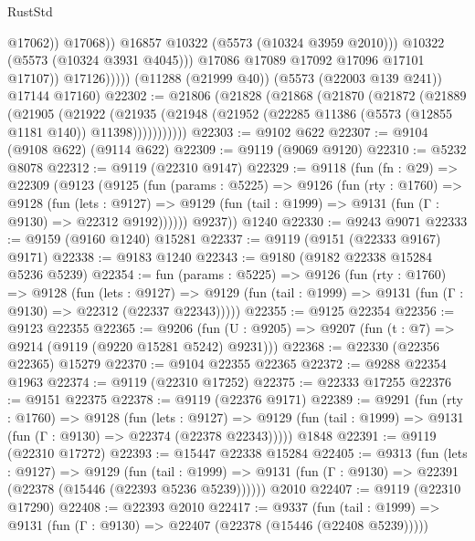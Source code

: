 \begin{lexlean}{RustStd}
\begin{coremodule}
                                @17062))
                            @17068))
                        @16857
                        @10322
                        (@5573 (@10324 @3959 @2010)))
                      @10322
                      (@5573 (@10324 @3931 @4045)))
                    @17086
                    @17089
                    @17092
                    @17096
                    @17101
                    @17107))
                @17126)))))
      (@11288 (@21999 @40))
      (@5573 (@22003 @139 @241))
      @17144
      @17160)
@22302 := @21806
    (@21828
      (@21868
        (@21870
          (@21872
            (@21889
              (@21905
                (@21922
                  (@21935
                    (@21948 (@21952 (@22285 @11386 (@5573 (@12855 @1181 @140)) @11398)))))))))))
@22303 := @9102 @622
@22307 := @9104 (@9108 @622) (@9114 @622)
@22309 := @9119 (@9069 @9120)
@22310 := @5232 @8078
@22312 := @9119 (@22310 @9147)
@22329 := @9118
    (fun (fn : @29) =>
    @22309
      (@9123
        (@9125
          (fun (params : @5225) =>
          @9126
            (fun (rty : @1760) =>
            @9128
              (fun (lets : @9127) =>
              @9129 (fun (tail : @1999) => @9131 (fun (Γ : @9130) => @22312 @9192))))))
        @9237))
    @1240
@22330 := @9243 @9071
@22333 := @9159 (@9160 @1240) @15281
@22337 := @9119 (@9151 (@22333 @9167) @9171)
@22338 := @9183 @1240
@22343 := @9180 (@9182 @22338 @15284 @5236 @5239)
@22354 := fun (params : @5225) =>
  @9126
    (fun (rty : @1760) =>
    @9128
      (fun (lets : @9127) =>
      @9129 (fun (tail : @1999) => @9131 (fun (Γ : @9130) => @22312 (@22337 @22343)))))
@22355 := @9125 @22354
@22356 := @9123 @22355
@22365 := @9206
    (fun (U : @9205) => @9207 (fun (t : @7) => @9214 (@9119 (@9220 @15281 @5242) @9231)))
@22368 := @22330 (@22356 @22365) @15279
@22370 := @9104 @22355 @22365
@22372 := @9288 @22354 @1963
@22374 := @9119 (@22310 @17252)
@22375 := @22333 @17255
@22376 := @9151 @22375
@22378 := @9119 (@22376 @9171)
@22389 := @9291
    (fun (rty : @1760) =>
    @9128
      (fun (lets : @9127) =>
      @9129 (fun (tail : @1999) => @9131 (fun (Γ : @9130) => @22374 (@22378 @22343)))))
    @1848
@22391 := @9119 (@22310 @17272)
@22393 := @15447 @22338 @15284
@22405 := @9313
    (fun (lets : @9127) =>
    @9129
      (fun (tail : @1999) =>
      @9131 (fun (Γ : @9130) => @22391 (@22378 (@15446 (@22393 @5236 @5239))))))
    @2010
@22407 := @9119 (@22310 @17290)
@22408 := @22393 @2010
@22417 := @9337
    (fun (tail : @1999) => @9131 (fun (Γ : @9130) => @22407 (@22378 (@15446 (@22408 @5239)))))

\end{coremodule}
\end{lexlean}
